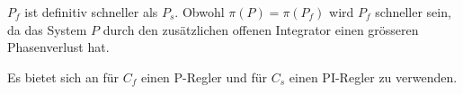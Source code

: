         $P_f$ ist definitiv schneller als $P_s$. Obwohl $\pi(P) =\pi(P_f)$ wird $P_f$ schneller sein, da das System $P$ durch den zusätzlichen offenen Integrator einen grösseren Phasenverlust hat.
        
        Es bietet sich an für $C_f$ einen P-Regler und für $C_s$ einen PI-Regler zu verwenden.